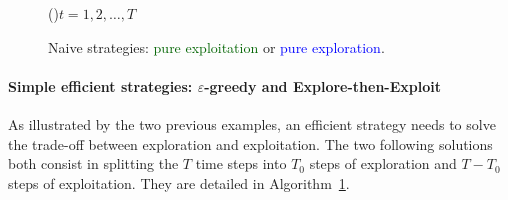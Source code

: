 \begin{figure}[h!]
	\centering
    \begin{framed}
	\begin{algorithm}[H]
		\For(){$t = 1, 2, \dots, T$}{
		}
		\caption{Naive strategies: \textcolor{darkgreen}{pure exploitation} or \textcolor{blue}{pure exploration}.}
		\label{algo:2:naiveStrategies}
	\end{algorithm}
	\end{framed}
\end{figure}


\paragraph{Simple efficient strategies: $\varepsilon$-greedy and Explore-then-Exploit}

As illustrated by the two previous examples, an efficient strategy needs to solve the trade-off between exploration and exploitation.
The two following solutions both consist in splitting the $T$ time steps into $T_0$ steps of exploration and $T-T_0$ steps of exploitation.
They are detailed in Algorithm~\ref{algo:2:naiveStrategies}.

